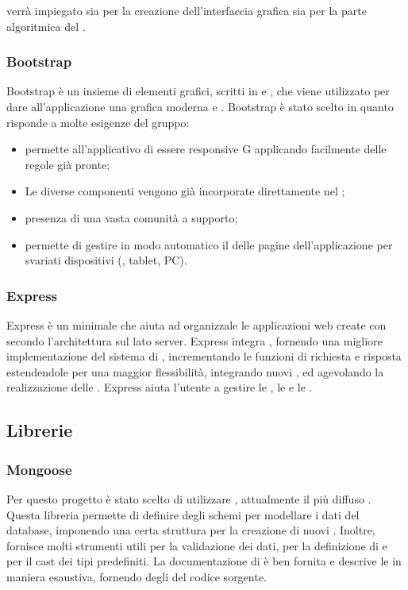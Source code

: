 \documentclass[12pt,a4paper]{article}
\begin{document}
 verrà impiegato sia per la creazione dell’interfaccia grafica sia per la parte algoritmica del .

\subsubsection{Bootstrap}\label{bootstrap}
Bootstrap è un insieme di elementi grafici, scritti in  e , che viene utilizzato per dare all'applicazione una grafica moderna e . Bootstrap è stato scelto in quanto risponde a molte esigenze del gruppo:

\begin{itemize}
	\item permette all’applicativo di essere responsive G applicando facilmente delle regole già pronte;
	\item Le diverse componenti vengono già incorporate direttamente nel  ;
	\item presenza di una vasta comunità a supporto;
	\item permette di gestire in modo automatico il  delle pagine dell'applicazione per svariati dispositivi (, tablet, PC).
\end{itemize}

\subsubsection{Express}\label{express}
Express è un  minimale che aiuta ad organizzale le applicazioni web create con  secondo l'architettura  sul lato server. Express integra , fornendo una migliore implementazione del sistema di , incrementando le funzioni di richiesta e risposta estendendole per una maggior flessibilità, integrando nuovi , ed agevolando la realizzazione delle . Express aiuta l'utente a gestire le , le  e le .


\subsection{Librerie}\label{librery}
\subsubsection{Mongoose}\label{mongoose}
Per questo progetto è stato scelto di utilizzare , attualmente il più diffuso . Questa libreria permette di definire degli schemi per modellare i dati del database, imponendo una certa struttura per la creazione di nuovi . Inoltre, fornisce molti strumenti utili per la validazione dei dati, per la definizione di  e per il cast dei tipi predefiniti.
La documentazione di  è ben fornita e descrive le  in maniera esaustiva, fornendo degli  del codice sorgente.
\end{document}
